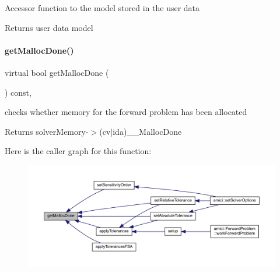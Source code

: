 Accessor function to the model stored in the user data

\begin{DoxyReturn}{Returns}
user data model 
\end{DoxyReturn}
\mbox{\label{classamici_1_1_solver_af4bbf9fea3348d86380be1c059e4b9f5}} 
\paragraph{\texorpdfstring{get\+Malloc\+Done()}{getMallocDone()}}
{\footnotesize\ttfamily virtual bool get\+Malloc\+Done (\begin{DoxyParamCaption}{ }\end{DoxyParamCaption}) const\hspace{0.3cm}{\ttfamily [protected]}, {}}

checks whether memory for the forward problem has been allocated

\begin{DoxyReturn}{Returns}
solver\+Memory-\/$>$(cv$\vert$ida)\+\_\+\+\_\+\+Malloc\+Done 
\end{DoxyReturn}
Here is the caller graph for this function\+:
\nopagebreak
\begin{figure}[H]
\begin{center}
\leavevmode
\includegraphics[width=350pt]{classamici_1_1_solver_af4bbf9fea3348d86380be1c059e4b9f5_icgraph}
\end{center}
\end{figure}
\mbox{\label{classamici_1_1_solver_a9673b3bc9248c4b7a156da9632b91436}} 
